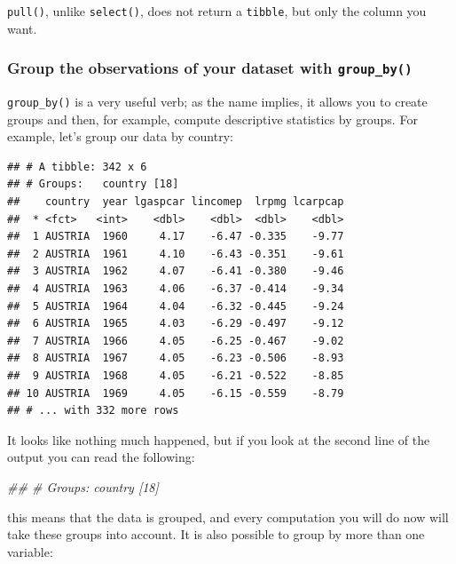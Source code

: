 \documentclass[]{gitbook}
\newenvironment{Shaded}{\begin{snugshade}}{\end{snugshade}}
\newcommand{\CommentTok}[1]{\textcolor[rgb]{0.56,0.35,0.01}{\textit{#1}}}
\newcommand{\KeywordTok}[1]{\textcolor[rgb]{0.13,0.29,0.53}{\textbf{#1}}}
\newcommand{\NormalTok}[1]{#1}
\newcommand{\OperatorTok}[1]{\textcolor[rgb]{0.81,0.36,0.00}{\textbf{#1}}}
\newcommand{\StringTok}[1]{\textcolor[rgb]{0.31,0.60,0.02}{#1}}
\theoremstyle{definition}
\theoremstyle{definition}
\theoremstyle{definition}
\theoremstyle{remark}
\begin{document}
\texttt{pull()}, unlike \texttt{select()}, does not return a
\texttt{tibble}, but only the column you want.

\hypertarget{group-the-observations-of-your-dataset-with-group_by}{%
\subsubsection{\texorpdfstring{Group the observations of your dataset
with
\texttt{group\_by()}}{Group the observations of your dataset with group\_by()}}\label{group-the-observations-of-your-dataset-with-group_by}}

\texttt{group\_by()} is a very useful verb; as the name implies, it
allows you to create groups and then, for example, compute descriptive
statistics by groups. For example, let's group our data by country:

\begin{Shaded}
\end{Shaded}

\begin{verbatim}
## # A tibble: 342 x 6
## # Groups:   country [18]
##    country  year lgaspcar lincomep  lrpmg lcarpcap
##  * <fct>   <int>    <dbl>    <dbl>  <dbl>    <dbl>
##  1 AUSTRIA  1960     4.17    -6.47 -0.335    -9.77
##  2 AUSTRIA  1961     4.10    -6.43 -0.351    -9.61
##  3 AUSTRIA  1962     4.07    -6.41 -0.380    -9.46
##  4 AUSTRIA  1963     4.06    -6.37 -0.414    -9.34
##  5 AUSTRIA  1964     4.04    -6.32 -0.445    -9.24
##  6 AUSTRIA  1965     4.03    -6.29 -0.497    -9.12
##  7 AUSTRIA  1966     4.05    -6.25 -0.467    -9.02
##  8 AUSTRIA  1967     4.05    -6.23 -0.506    -8.93
##  9 AUSTRIA  1968     4.05    -6.21 -0.522    -8.85
## 10 AUSTRIA  1969     4.05    -6.15 -0.559    -8.79
## # ... with 332 more rows
\end{verbatim}

It looks like nothing much happened, but if you look at the second line
of the output you can read the following:

\begin{Shaded}
\begin{Highlighting}[]
\CommentTok{## # Groups:   country [18]}
\end{Highlighting}
\end{Shaded}

this means that the data is grouped, and every computation you will do
now will take these groups into account. It is also possible to group by
more than one variable:
\end{document}

